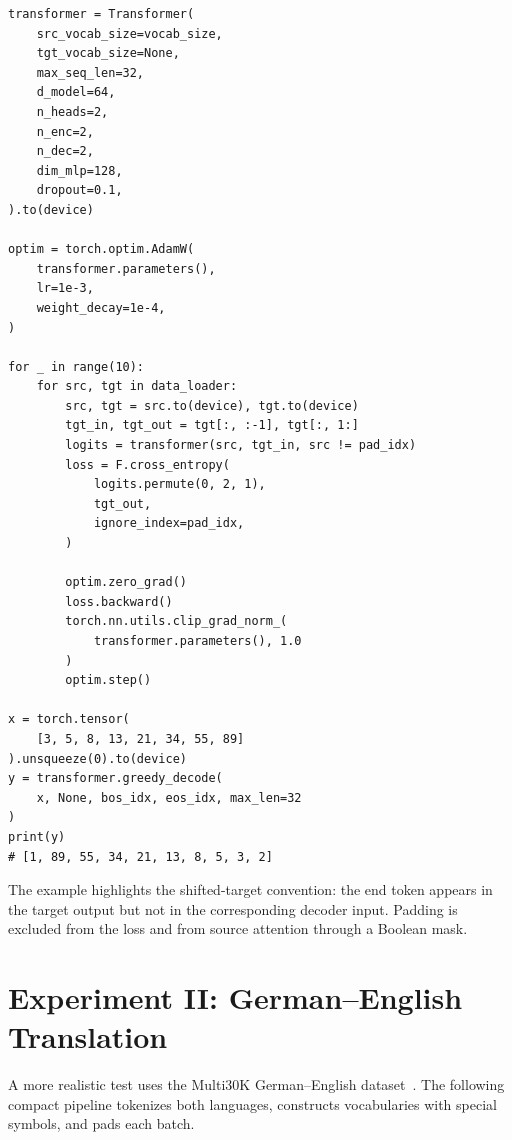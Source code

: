 \documentclass[11pt]{article}
\begin{document}
\begin{lstlisting}[caption={Training and evaluating the reversal model.},label={lst:reverse_train}]
transformer = Transformer(
    src_vocab_size=vocab_size,
    tgt_vocab_size=None,
    max_seq_len=32,
    d_model=64,
    n_heads=2,
    n_enc=2,
    n_dec=2,
    dim_mlp=128,
    dropout=0.1,
).to(device)

optim = torch.optim.AdamW(
    transformer.parameters(),
    lr=1e-3,
    weight_decay=1e-4,
)

for _ in range(10):
    for src, tgt in data_loader:
        src, tgt = src.to(device), tgt.to(device)
        tgt_in, tgt_out = tgt[:, :-1], tgt[:, 1:]
        logits = transformer(src, tgt_in, src != pad_idx)
        loss = F.cross_entropy(
            logits.permute(0, 2, 1),
            tgt_out,
            ignore_index=pad_idx,
        )

        optim.zero_grad()
        loss.backward()
        torch.nn.utils.clip_grad_norm_(
            transformer.parameters(), 1.0
        )
        optim.step()

x = torch.tensor(
    [3, 5, 8, 13, 21, 34, 55, 89]
).unsqueeze(0).to(device)
y = transformer.greedy_decode(
    x, None, bos_idx, eos_idx, max_len=32
)
print(y)
# [1, 89, 55, 34, 21, 13, 8, 5, 3, 2]
\end{lstlisting}

The example highlights the shifted-target convention: the end token appears in the target output but not in the corresponding decoder input. Padding is excluded from the loss and from source attention through a Boolean mask.

\section{Experiment II: German--English Translation}
\label{sec:translation}

A more realistic test uses the Multi30K German--English dataset~\cite{elliott2016multi30k}. The following compact pipeline tokenizes both languages, constructs vocabularies with special symbols, and pads each batch.
\end{document}
